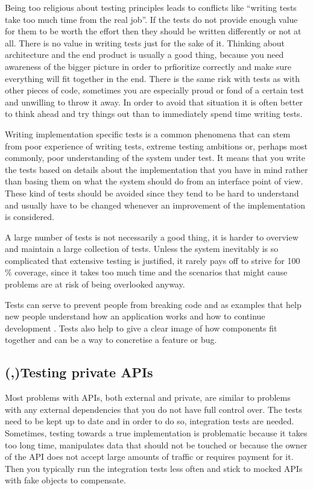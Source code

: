 \documentclass[11pt]{article}
\begin{document}
Being too religious about testing principles leads to conflicts like ``writing tests take too much time from the real job''. If the tests do not provide enough value for them to be worth the effort then they should be written differently or not at all. There is no value in writing tests just for the sake of it. Thinking about architecture and the end product is usually a good thing, because you need awareness of the bigger picture in order to prfioritize correctly and make sure everything will fit together in the end. There is the same risk with tests as with other pieces of code, sometimes you are especially proud or fond of a certain test and unwilling to throw it away. In order to avoid that situation it is often better to think ahead and try things out than to immediately spend time writing tests. \cite[question~27]{Edelstam}

Writing implementation specific tests is a common phenomena that can stem from poor experience of writing tests, extreme testing ambitions or, perhaps most commonly, poor understanding of the system under test. It means that you write the tests based on details about the implementation that you have in mind rather than basing them on what the system should do from an interface point of view. These kind of tests should be avoided since they tend to be hard to understand and usually have to be changed whenever an improvement of the implementation is considered.

A large number of tests is not necessarily a good thing, it is harder to overview and maintain a large collection of tests. Unless the system inevitably is so complicated that extensive testing is justified, it rarely pays off to strive for 100 \% coverage, since it takes too much time and the scenarios that might cause problems are at risk of being overlooked anyway. \cite[question~28]{Edelstam}

Tests can serve to prevent people from breaking code and as examples that help new people understand how an application works and how to continue development \cite[questions~31-32]{Edelstam}. Tests also help to give a clear image of how components fit together and can be a way to concretise a feature or bug.

\subsection{(,)Testing private APIs}

Most problems with APIs, both external and private, are similar to problems with any external dependencies that you do not have full control over. The tests need to be kept up to date and in order to do so, integration tests are needed. Sometimes, testing towards a true implementation is problematic because it takes too long time, manipulates data that should not be touched or because the owner of the API does not accept large amounts of traffic or requires payment for it. Then you typically run the integration tests less often and stick to mocked APIs with fake objects to compensate. \cite[questions~19-20]{Stenmark}
\end{document}
